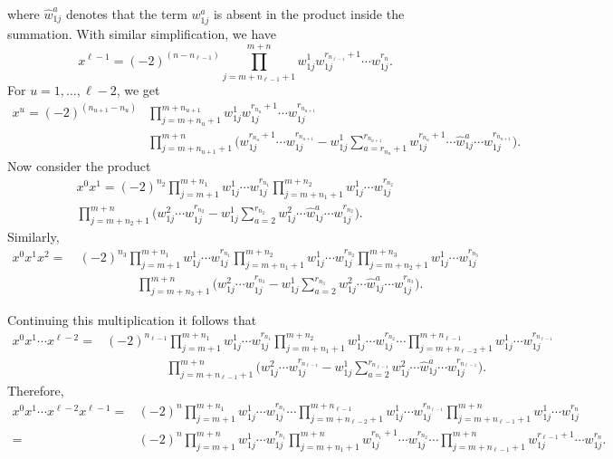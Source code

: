 \documentclass[12pt,oneside,reqno]{amsart}
\theoremstyle{plain}
\theoremstyle{definition}
\theoremstyle{remark}
\begin{document}
where $\hat{w}^a_{1j}$ denotes that the term ${w}^a_{1j}$ is absent in the product inside the summation. 
With similar simplification, we have
$$x^{\ell-1} = (-2)^{(n-n_{\ell-1})} \prod^{m+n}_{j=m+n_{\ell-1}+1} w^1_{1j} w^{r_{n_{\ell-1}}+1}_{1j} \cdots w^{r_n}_{1j}.$$
For $u = 1,\ldots, \ell-2$, we get
\begin{align*}
x^u =  (-2)^{(n_{u+1}- n_u)} & \prod^{m+n_{u+1}}_{j=m + n_u + 1} w^1_{1j} w^{r_{n_u}+1}_{1j} \cdots w^{r_{n_{u+1}}}_{1j}\\
 & \prod^{m+n}_{j=m+n_{u+1}+1} \Big(w^{r_{n_u}+1}_{1j} \cdots w^{r_{n_{u+1}}}_{1j} - w^1_{1j} \sum^{r_{n_{u+1}}}_{a=r_{n_u}+1}  w^{r_{n_u}+1}_{1j} \cdots \hat{w}^a_{1j}\cdots w^{r_{n_{u+1}}}_{1j}\Big).
\end{align*}
Now consider the product
\begin{multline*}
x^0 x^1= (-2)^{n_2} \prod^{m+n_1}_{j=m+1} w^1_{1j}\cdots w^{r_{n_1}}_{1j} \prod^{m+n_2}_{j=m+n_1 +1} w^1_{1j}\cdots w^{r_{n_2}}_{1j} 
\\
\prod^{m+n}_{j=m+n_2+1}\Big({w}^2_{1j}\cdots w^{r_{n_2}}_{1j} - w^1_{1j} \sum^{r_{n_2}}_{a=2} w^2_{1j}\cdots \hat{w}^a_{1j}\cdots w^{r_{n_2}}_{1j} \Big).
\end{multline*}
Similarly,
\begin{align*}
x^0 x^1 x^2 = & ~(-2)^{n_3} \prod^{m+n_1}_{j=m+1} w^1_{1j}\cdots w^{r_{n_1}}_{1j} \prod^{m+n_2}_{j=m+n_1 +1} w^1_{1j}\cdots w^{r_{n_2}}_{1j} \prod^{m+n_3}_{j=m+n_2+1} w^1_{1j}\cdots w^{r_{n_3}}_{1j}\\
& \hspace{2cm} \prod^{m+n}_{j=m+n_3+1} \Big(w^2_{1j}\cdots w^{r_{n_3}}_{1j} - w^1_{1j} \sum^{r_{n_3}}_{a=2} w^2_{1j}\cdots \hat{w}^a_{1j}\cdots w^{r_{n_3}}_{1j}\Big).
\end{align*}

\pagebreak

\noindent Continuing this multiplication it follows that 
\begin{align*}
x^0 x^1 \cdots x^{\ell-2} = & (-2)^{n_{\ell-1}} \prod^{m+n_1}_{j=m+1} w^1_{1j}\cdots w^{r_{n_1}}_{1j} \prod^{m+n_2}_{j=m+n_1 +1} w^1_{1j}\cdots w^{r_{n_2}}_{1j}\cdots \prod^{m+n_{\ell-1}}_{j=m+n_{\ell-2}+1} w^1_{1j}\cdots w^{r_{n_{\ell-1}}}_{1j}\\
& \hspace{2cm} \prod^{m+n}_{j=m+n_{\ell-1}+1} \Big(w^2_{1j}\cdots w^{r_{n_{\ell-1}}}_{1j} - w^1_{1j} \sum^{r_{n_{\ell-1}}}_{a=2} w^2_{1j}\cdots \hat{w}^a_{1j}\cdots w^{r_{n_{\ell-1}}}_{1j}\Big).
\end{align*}
Therefore, 
\begin{align*}
x^0 x^1 \cdots x^{\ell-2} x^{\ell-1} = & (-2)^n \prod^{m+n_1}_{j=m+1} w^1_{1j}\cdots w^{r_{n_1}}_{1j} \cdots \prod^{m+n_{\ell-1}}_{j=m+n_{\ell-2}+1} w^1_{1j}\cdots w^{r_{n_{\ell-1}}}_{1j} \prod^{m+n}_{j=m+n_{\ell-1}+1} w^1_{1j}\cdots w^{r_n}_{1j}\\
= &(-2)^n \prod^{m+n}_{j=m+1} w^1_{1j}\cdots w^{r_{n_1}}_{1j} \prod^{m+n}_{j=m+n_1+1} w^{r_{n_1}+1}_{1j} \cdots w^{r_{n_2}}_{1j} \cdots \prod^{m+n}_{j=m+n_{\ell-1}+1} w^{r_{\ell-1}+1}_{1j}\cdots w^{r_n}_{1j}.
\end{align*}
\end{document}
